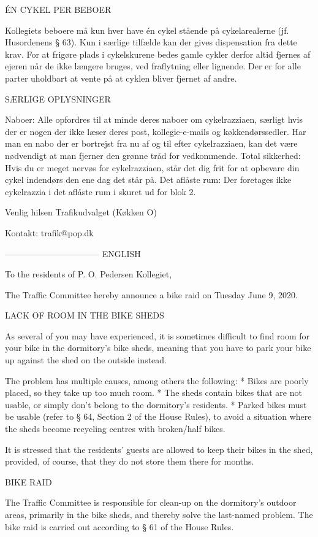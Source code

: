 ÉN CYKEL PER BEBOER

Kollegiets beboere må kun hver have én cykel stående på cykelarealerne (jf. Husordenens § 63). Kun i særlige tilfælde kan der gives dispensation fra dette krav. For at frigøre plads i cykelskurene bedes gamle cykler derfor altid fjernes af ejeren når de ikke længere bruges, ved fraflytning eller lignende. Der er for alle parter uholdbart at vente på at cyklen bliver fjernet af andre.


SÆRLIGE OPLYSNINGER

Naboer: Alle opfordres til at minde deres naboer om cykelrazziaen, særligt hvis der er nogen der ikke læser deres post, kollegie-e-mails og køkkendørssedler. Har man en nabo der er bortrejst fra nu af og til efter cykelrazziaen, kan det være nødvendigt at man fjerner den grønne tråd for vedkommende.
Total sikkerhed: Hvis du er meget nervøs for cykelrazziaen, står det dig frit for at opbevare din cykel indendørs den ene dag det står på.
Det aflåste rum: Der foretages ikke cykelrazzia i det aflåste rum i skuret ud for blok 2.

Venlig hilsen
Trafikudvalget (Køkken O)

Kontakt: trafik@pop.dk


---------------------------------
ENGLISH

To the residents of P. O. Pedersen Kollegiet,

The Traffic Committee hereby announce a bike raid on Tuesday June 9, 2020.


LACK OF ROOM IN THE BIKE SHEDS

As several of you may have experienced, it is sometimes difficult to find room for your bike in the dormitory's bike sheds, meaning that you have to park your bike up against the shed on the outside instead.

The problem has multiple causes, among others the following:
* Bikes are poorly placed, so they take up too much room.
* The sheds contain bikes that are not usable, or simply don’t belong to the dormitory’s residents.
* Parked bikes must be usable (refer to § 64, Section 2 of the House Rules), to avoid a situation where the sheds become recycling centres with broken/half bikes.

It is stressed that the residents' guests are allowed to keep their bikes in the shed, provided, of course, that they do not store them there for months.


BIKE RAID

The Traffic Committee is responsible for clean-up on the dormitory's outdoor areas, primarily in the bike sheds, and thereby solve the last-named problem. The bike raid is carried out according to § 61 of the House Rules.

